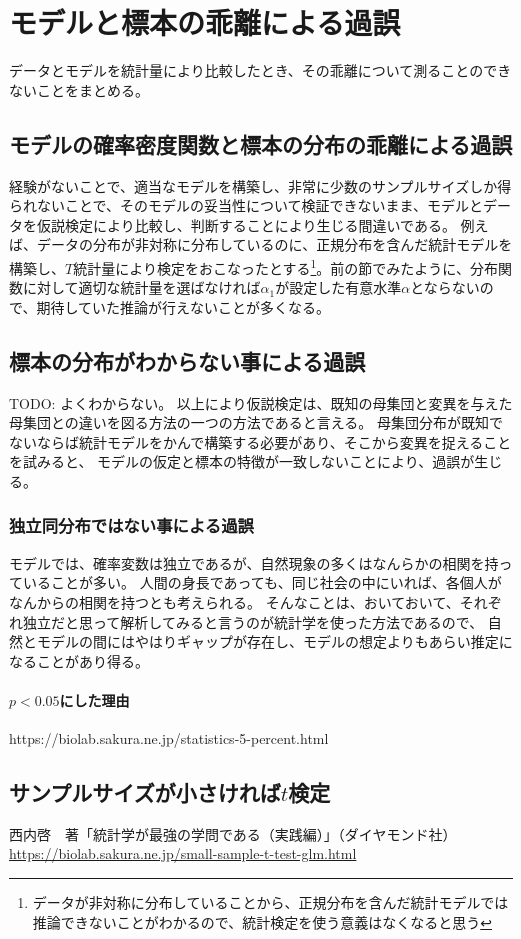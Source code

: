 
\section{モデルと標本の乖離による過誤}
データとモデルを統計量により比較したとき、その乖離について測ることのできないことをまとめる。

\subsection{モデルの確率密度関数と標本の分布の乖離による過誤}
経験がないことで、適当なモデルを構築し、非常に少数のサンプルサイズしか得られないことで、そのモデルの妥当性について検証できないまま、モデルとデータを仮説検定により比較し、判断することにより生じる間違いである。
例えば、データの分布が非対称に分布しているのに、正規分布を含んだ統計モデルを構築し、$T$統計量により検定をおこなったとする\footnote{データが非対称に分布していることから、正規分布を含んだ統計モデルでは推論できないことがわかるので、統計検定を使う意義はなくなると思う}。前の節でみたように、分布関数に対して適切な統計量を選ばなければ$\alpha_1$が設定した有意水準$\alpha$とならないので、期待していた推論が行えないことが多くなる。


\subsection{標本の分布がわからない事による過誤}
TODO: よくわからない。
以上により仮説検定は、既知の母集団と変異を与えた母集団との違いを図る方法の一つの方法であると言える。
母集団分布が既知でないならば統計モデルをかんで構築する必要があり、そこから変異を捉えることを試みると、
モデルの仮定と標本の特徴が一致しないことにより、過誤が生じる。

\subsubsection{独立同分布ではない事による過誤}
モデルでは、確率変数は独立であるが、自然現象の多くはなんらかの相関を持っていることが多い。
人間の身長であっても、同じ社会の中にいれば、各個人がなんからの相関を持つとも考えられる。
そんなことは、おいておいて、それぞれ独立だと思って解析してみると言うのが統計学を使った方法であるので、
自然とモデルの間にはやはりギャップが存在し、モデルの想定よりもあらい推定になることがあり得る。
\fi
{}
\paragraph{$p<0.05$にした理由}
https://biolab.sakura.ne.jp/statistics-5-percent.html
\fi



\subsection{サンプルサイズが小さければ$t$検定}
西内啓　著「統計学が最強の学問である（実践編）」（ダイヤモンド社）
\url{https://biolab.sakura.ne.jp/small-sample-t-test-glm.html}
\fi 
